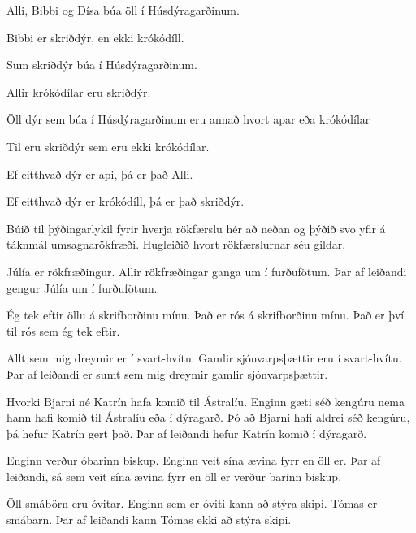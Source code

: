 \begin{earg}
\item Alli, Bibbi og Dísa búa öll í Húsdýragarðinum. 
\item Bibbi er skriðdýr, en ekki krókódíll.
\item Sum skriðdýr búa í Húsdýragarðinum. 
\item Allir krókódílar eru skriðdýr.
\item Öll dýr sem búa í Húsdýragarðinum eru annað hvort apar eða krókódílar 
\item Til eru skriðdýr sem eru ekki krókódílar.
\item Ef eitthvað dýr er api, þá er það Alli.
\item Ef eitthvað dýr er krókódíll, þá er það skriðdýr.
\end{earg}


\problempart
\label{pr.FOLarguments}
Búið til þýðingarlykil fyrir hverja rökfærslu hér að neðan og þýðið svo yfir á táknmál umsagnarökfræði. Hugleiðið hvort rökfærslurnar séu gildar.
\begin{earg}
\item Júlía er rökfræðingur. Allir rökfræðingar ganga um í furðufötum. Þar af leiðandi gengur Júlía um í furðufötum.
\item Ég tek eftir öllu á skrifborðinu mínu. Það er rós á skrifborðinu mínu. Það er því til rós sem ég tek eftir.
\item Allt sem mig dreymir er í svart-hvítu. Gamlir sjónvarpsþættir eru í svart-hvítu. Þar af leiðandi er sumt sem mig dreymir gamlir sjónvarpsþættir.
\item Hvorki Bjarni né Katrín hafa komið til Ástralíu. Enginn gæti séð kengúru nema hann hafi komið til Ástralíu eða í dýragarð. Þó að Bjarni hafi aldrei séð kengúru, þá hefur Katrín gert það. Þar af leiðandi hefur Katrín komið í dýragarð.
\item Enginn verður óbarinn biskup. Enginn veit sína ævina fyrr en öll er. Þar af leiðandi, sá sem veit sína ævina fyrr en öll er verður barinn biskup.
\item Öll smábörn eru óvitar. Enginn sem er óviti kann að stýra skipi. Tómas er smábarn. Þar af leiðandi kann Tómas ekki að stýra skipi.
\end{earg}


